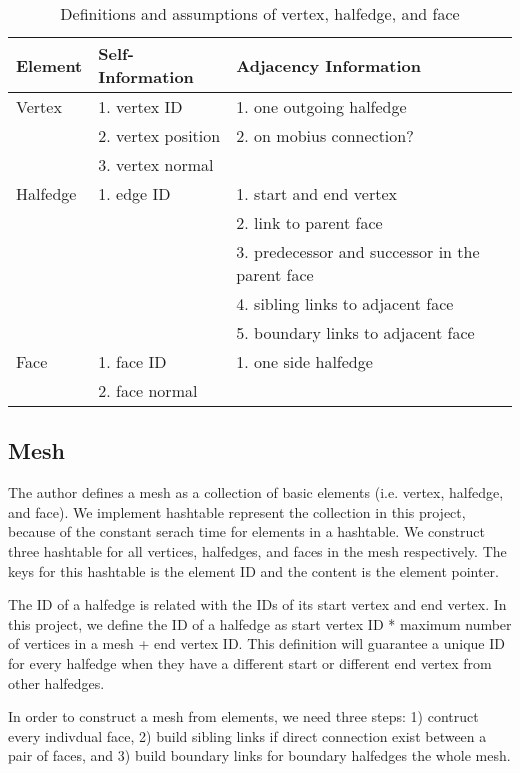 \documentclass[12pt]{article}
\begin{document}
\begin{table}[ht]
\centering
\begin{tabular}{| l | p{} | p{}|}

\hline
Element & Self-Information & Adjacency Information  \\
\hline
Vertex  & 1. vertex ID & 1. one outgoing halfedge   \\
& 2. vertex position & 2. on mobius connection? \\
& 3. vertex normal & \\
\hline
Halfedge & 1. edge ID & 1. start and end vertex\\
& & 2. link to parent face\\
& & 3. predecessor and successor in the parent face\\
& & 4. sibling links to adjacent face\\
& & 5. boundary links to adjacent face \\
\hline
Face    &  1. face ID & 1. one side halfedge\\
& 2. face normal &\\
\hline
\end{tabular}
\caption{Definitions and assumptions of vertex, halfedge, and face} 
\label{table:vhfInfo}
\end{table}

\subsection{Mesh}
The author defines a mesh as a collection of basic elements (i.e. vertex, halfedge, and face). We implement hashtable represent the collection in this project, because of the constant serach time for elements in a hashtable. We construct three hashtable for all vertices, halfedges, and faces in the mesh respectively. The keys for this hashtable is the element ID and the content is the element pointer.

The ID of a halfedge is related with the IDs of its start vertex and end vertex. In this project, we define the ID of a halfedge as start vertex ID * maximum number of vertices in a mesh + end vertex ID. This definition will guarantee a unique ID for every halfedge when they have a different start or different end vertex from other halfedges. 

In order to construct a mesh from elements, we need three steps: 1) contruct every indivdual face, 2) build sibling links if direct connection exist between a pair of faces, and 3) build boundary links for boundary halfedges the whole mesh. 
\end{document}
